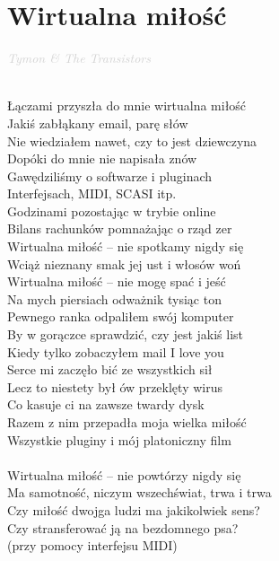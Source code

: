 \documentclass[a5paper, 10pt]{book}
\begin{document}
\section{Wirtualna miłość}\textcolor{lightgray}{\textit{Tymon \& The Transistors}}\\~\\
\begin{minipage}[t]{0.8\textwidth}
Łączami przyszła do mnie wirtualna miłość\\
Jakiś zabłąkany email, parę słów\\
Nie wiedziałem nawet, czy to jest dziewczyna\\
Dopóki do mnie nie napisała znów\\
Gawędziliśmy o softwarze i pluginach\\
Interfejsach, MIDI, SCASI itp.\\
Godzinami pozostając w trybie online\\
Bilans rachunków pomnażając o rząd zer\\

\hspace*{5mm}Wirtualna miłość – nie spotkamy nigdy się\\
\hspace*{5mm}Wciąż nieznany smak jej ust i włosów woń\\
\hspace*{5mm}Wirtualna miłość – nie mogę spać i jeść\\
\hspace*{5mm}Na mych piersiach odważnik tysiąc ton\\

Pewnego ranka odpaliłem swój komputer\\
By w gorączce sprawdzić, czy jest jakiś list\\
Kiedy tylko zobaczyłem mail I love you\\
Serce mi zaczęło bić ze wszystkich sił\\
Lecz to niestety był ów przeklęty wirus\\
Co kasuje ci na zawsze twardy dysk\\
Razem z nim przepadła moja wielka miłość\\
Wszystkie pluginy i mój platoniczny film\\
\\
\hspace*{5mm}Wirtualna miłość – nie powtórzy nigdy się\\
\hspace*{5mm}Ma samotność, niczym wszechświat, trwa i trwa\\
\hspace*{5mm}Czy miłość dwojga ludzi ma jakikolwiek sens?\\
\hspace*{5mm}Czy stransferować ją na bezdomnego psa?\\
\hspace*{5mm}(przy pomocy interfejsu MIDI)

\end{minipage}
\end{document}
